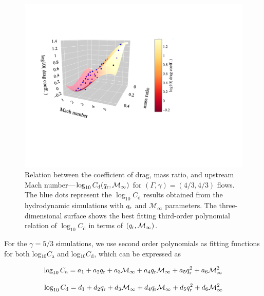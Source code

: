 \begin{figure}
  \centering
  \includegraphics[width=14cm]{figures/common_envelope/logdrag_order3_g43_inc_mdotdrag.pdf}
\caption{Relation between the coefficient of drag, mass ratio, and upstream Mach number---$\log_{10}C_{\mathrm d} (q_{\rm r}, \mathcal{M}_\infty)$ for $(\Gamma, \gamma) = (4/3, 4/3)$ flows. The blue dots represent the $\log_{10}C_{\mathrm d}$ results obtained from the hydrodynamic simulations with $q_{\rm r}$ and $\mathcal{M}_\infty$ parameters. The three-dimensional surface shows the best fitting third-order polynomial relation of $\log_{10}C_{\mathrm d}$ in terms of $(q_{\rm r}, \mathcal{M}_\infty)$.\label{fig:logdrag_g43}}
\end{figure}

For the $\gamma=5/3$ simulations, we use second order polynomials as fitting functions for both log$_{10}C_{\mathrm a}$  and log$_{10}C_{\mathrm d}$, which can be expressed as

\begin{equation}
\label{eq:logmdot_g53}
\begin{split}
\log_{10} C_{\mathrm a} = a_1 + a_2 q_{\rm r} + a_3 \mathcal{M}_\infty + a_4 q_{\rm r}\mathcal{M}_\infty + a_5 q_{\rm r}^2 + a_6 \mathcal{M}_\infty^2
\end{split}
\end{equation}

\begin{equation}
\label{eq:logdrag_g53}
\begin{split}
\log_{10} C_{\mathrm d} = d_1 + d_2 q_{\rm r} + d_3 \mathcal{M}_\infty + d_4 q_{\rm r}\mathcal{M}_\infty + d_5 q_{\rm r}^2 + d_6 \mathcal{M}_\infty^2
\end{split}
\end{equation}


